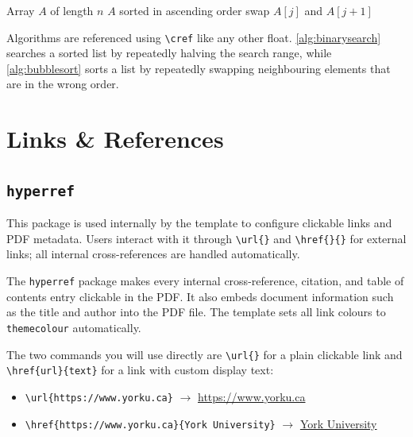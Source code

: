 \begin{algorithm}[H]
	\caption{Bubble Sort}
	\label{alg:bubblesort}
	\begin{algorithmic}[1]
		\Require Array $A$ of length $n$
		\Ensure $A$ sorted in ascending order
		\State swap $A[j]$ and $A[j+1]$ 
		\EndIf
		\EndFor
		\EndFor
		\EndFunction
	\end{algorithmic}
\end{algorithm}

Algorithms are referenced using \texttt{\textbackslash cref} like any other float. \cref{alg:binarysearch} searches a sorted list by repeatedly halving the search range, while \cref{alg:bubblesort} sorts a list by repeatedly swapping neighbouring elements that are in the wrong order.

\section{Links \& References}

\subsection{\texttt{hyperref}}
\noindent\colorbox{themecolour!15}{\parbox{\linewidth}{\small This package is used internally by the template to configure clickable links and PDF metadata. Users interact with it through \texttt{\textbackslash url\{\}} and \texttt{\textbackslash href\{\}\{\}} for external links; all internal cross-references are handled automatically.}}\vspace{0.5\baselineskip}

The \texttt{hyperref} package makes every internal cross-reference, citation, and table of contents entry clickable in the PDF. It also embeds document information such as the title and author into the PDF file. The template sets all link colours to \texttt{themecolour} automatically.

The two commands you will use directly are \texttt{\textbackslash url\{\}} for a plain clickable link and \texttt{\textbackslash href\{url\}\{text\}} for a link with custom display text:

\begin{itemize}[noitemsep]
	\item \texttt{\textbackslash url\{https://www.yorku.ca\}} $\to$ \url{https://www.yorku.ca}
	\item \texttt{\textbackslash href\{https://www.yorku.ca\}\{York University\}} $\to$ \href{https://www.yorku.ca}{York University}
\end{itemize}


